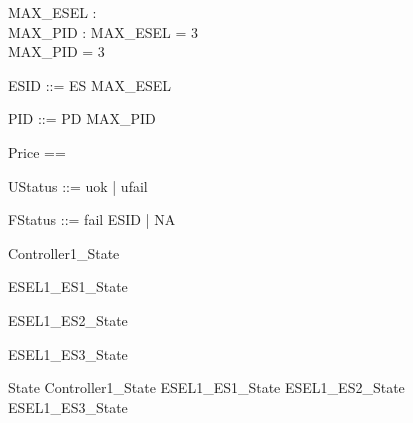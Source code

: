 \documentclass{article}
\begin{document}

\begin{axdef}
	MAX\_ESEL : \nat \\
 MAX\_PID : \nat 
\where
 MAX\_ESEL = 3 \\
 MAX\_PID = 3
\end{axdef}

\begin{zed}
	ESID ::= ES  \upto MAX\_ESEL \rdata
\end{zed}

\begin{zed}
	PID ::= PD  \upto MAX\_PID \rdata
\end{zed}

\begin{zed}
	Price == \nat
\end{zed}

\begin{zed}
	UStatus ::= uok | ufail
\end{zed}

\begin{zed}
	FStatus ::= fail \ldata ESID \rdata | NA
\end{zed}

\begin{zed}
	Controller1\_State 
\end{zed}

\begin{zed}
	ESEL1\_ES1\_State 
\end{zed}

\begin{zed}
	ESEL1\_ES2\_State 
\end{zed}

\begin{zed}
	ESEL1\_ES3\_State 
\end{zed}

\begin{zed}
	State  Controller1\_State \land ESEL1\_ES1\_State \land ESEL1\_ES2\_State \land ESEL1\_ES3\_State
\end{zed}
\end{document}
